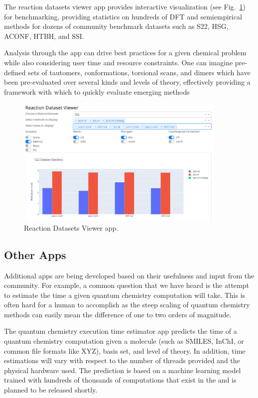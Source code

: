 \documentclass[journal=jctcce,manuscript=article]{achemso}
\newcommand{\mqcas}{{\sc{mqcas}}\xspace}%
\begin{document}
The reaction datasets viewer app provides interactive visualization (see Fig.~\ref{fig:dbapp}) for benchmarking, providing statistics on hundreds of DFT and semiempirical methods for dozens of community benchmark datasets such as S22,\cite{Jurecka:2006:1985, Marshall:2011:194102}
HSG,\cite{Faver:2011:790, Marshall:2011:194102}
ACONF,\cite{Gruzman:2009:11974}
HTBH,\cite{Zhao:2005:2012} and
SSI.\cite{Burns:2017:161727}

Analysis through the app can drive best practices for a given chemical problem while also considering user time and resource constraints. One can imagine pre-defined sets of tautomers, conformations, torsional scans, and dimers which have been pre-evaluated over several kinds and levels of theory, effectively providing a framework with which to quickly evaluate emerging methods

\begin{figure}[H]
\includegraphics[width=0.9\textwidth]{./images/apps_reaction_datasets.png}
\centering
\caption{Reaction Datasets Viewer app.
\label{fig:dbapp}}
\end{figure}

\subsection{Other Apps}

Additional apps are being developed based on their usefulness and input from the community.
For example, a common question that we have heard is the attempt to estimate the time a given quantum chemistry computation will take.
This is often hard for a human to accomplish as the steep scaling of quantum chemistry methods can easily mean the difference of one to two orders of magnitude.

The quantum chemistry execution time estimator app predicts the time of a quantum chemistry computation given a molecule (such as SMILES, InChI, or common file formats like XYZ), basis set, and level of theory.
In addition, time estimations will vary with respect to the number of threads provided and the physical hardware used.
The prediction is based on a machine learning model trained with hundreds of thousands of computations that exist in the \mqcas and is planned to be released shortly.
\end{document}
